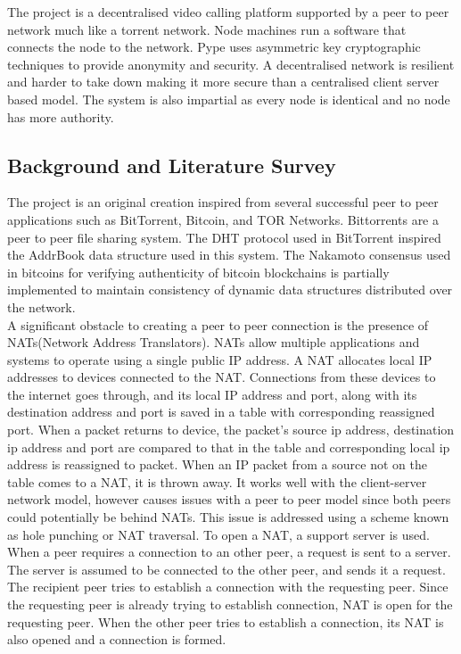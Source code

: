 \documentclass[a4paper,11pt]{article}
\begin{document}
        The project is a decentralised video calling platform supported by a peer to peer network
much like a torrent network. Node machines run a software that connects the node to
the network. Pype uses asymmetric key cryptographic techniques to provide anonymity
and security. A decentralised network is resilient and harder to take down making it
more secure than a centralised client server based model. The system is also impartial as every node is identical and no node has more authority.

\subsection{Background and Literature Survey}
The project is an original creation inspired from several successful peer to peer applications such as BitTorrent, Bitcoin, and TOR Networks. Bittorrents are a peer to peer file sharing system. The DHT protocol used in BitTorrent inspired the AddrBook data structure used in this system. The Nakamoto consensus used in bitcoins for verifying authenticity of bitcoin blockchains is partially implemented to maintain consistency of dynamic data structures distributed over the network.\\

A significant obstacle to creating a peer to peer connection is the presence of NATs(Network Address Translators). NATs allow multiple applications and systems to operate using a single public IP address. A NAT allocates local IP addresses to devices connected to the NAT. Connections from these devices to the internet goes through, and its local IP address and port, along with its destination address and port is saved in a table with corresponding reassigned port. When a packet returns to device, the packet's source ip address, destination ip address and port are compared to that in the table and corresponding local ip address is reassigned to packet. When an IP packet from a source not on the table comes to a NAT, it is thrown away. It works well with the client-server network model, however causes issues with a peer to peer model since both peers could potentially be behind NATs. This issue is addressed using a scheme known as hole punching or NAT traversal. To open a NAT, a support server is used. When a peer requires a connection to an other peer, a request is sent to a server. The server is assumed to be connected to the other peer, and sends it a request. The recipient peer tries to establish a connection with the requesting peer. Since the requesting peer is already trying to establish connection, NAT is open for the requesting peer. When the other peer tries to establish a connection, its NAT is also opened and a connection is formed.
\end{document}
